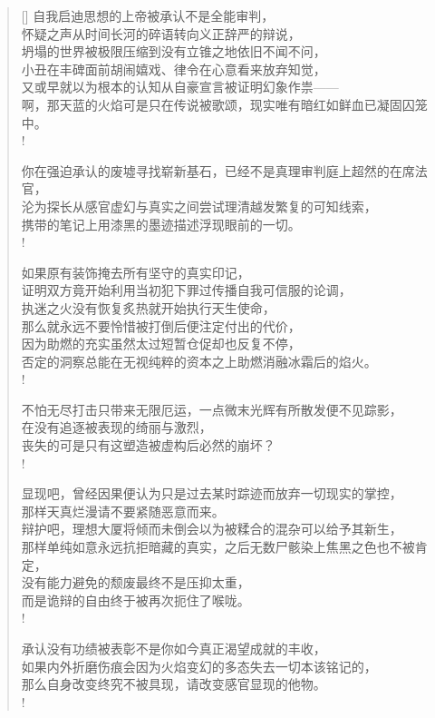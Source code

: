 \documentclass[UTF8, 12pt, a4paper]{ctexrep} %
\begin{document}
\begin{verse}[\versewidth]
自我启迪思想的上帝被承认不是全能审判，\\
怀疑之声从时间长河的碎语转向义正辞严的辩说，\\
坍塌的世界被极限压缩到没有立锥之地依旧不闻不问，\\
小丑在丰碑面前胡闹嬉戏、律令在心意看来放弃知觉，\\
又或早就以为根本的认知从自豪宣言被证明幻象作祟——\\
啊，那天蓝的火焰可是只在传说被歌颂，现实唯有暗红如鲜血已凝固囚笼中。\\!

你在强迫承认的废墟寻找崭新基石，已经不是真理审判庭上超然的在席法官，\\
沦为探长从感官虚幻与真实之间尝试理清越发繁复的可知线索，\\
携带的笔记上用漆黑的墨迹描述浮现眼前的一切。\\!

如果原有装饰掩去所有坚守的真实印记，\\
证明双方竟开始利用当初犯下罪过传播自我可信服的论调，\\
执迷之火没有恢复炙热就开始执行天生使命，\\
那么就永远不要怜惜被打倒后便注定付出的代价，\\
因为助燃的充实虽然太过短暂仓促却也反复不停，\\
否定的洞察总能在无视纯粹的资本之上助燃消融冰霜后的焰火。\\!

不怕无尽打击只带来无限厄运，一点微末光辉有所散发便不见踪影，\\
在没有追逐被表现的绮丽与激烈，\\
丧失的可是只有这塑造被虚构后必然的崩坏？\\!

显现吧，曾经因果便认为只是过去某时踪迹而放弃一切现实的掌控，\\
那样天真烂漫请不要紧随恶意而来。\\
辩护吧，理想大厦将倾而未倒会以为被糅合的混杂可以给予其新生，\\
那样单纯如意永远抗拒暗藏的真实，之后无数尸骸染上焦黑之色也不被肯定，\\
没有能力避免的颓废最终不是压抑太重，\\
而是诡辩的自由终于被再次扼住了喉咙。\\!

承认没有功绩被表彰不是你如今真正渴望成就的丰收，\\
如果内外折磨伤痕会因为火焰变幻的多态失去一切本该铭记的，\\
那么自身改变终究不被具现，请改变感官显现的他物。\\!


\end{verse}
\end{document}
